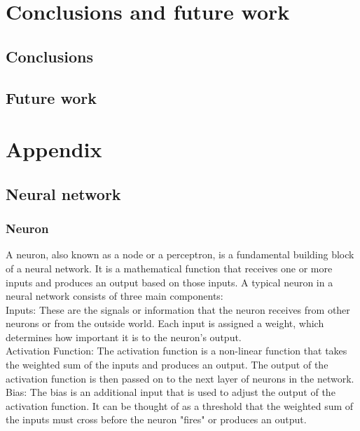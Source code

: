 \documentclass[a4paper]{sapthesis}
\begin{document}
\chapter{Conclusions and future work}
\section{Conclusions}
\section{Future work}
\chapter{Appendix}
\section {Neural network}
\subsection{Neuron}\label{sec:neuron}
A neuron, also known as a node or a perceptron, is a fundamental building
 block of a neural network. It is a mathematical function that receives one
or more inputs and produces an output based on those inputs. \newline 
A typical neuron in a neural network consists of three main components:\newline \\
Inputs: These are the signals or information that the neuron receives from 
other neurons or from the outside world.
 Each input is assigned a weight, which determines how important it is 
 to the neuron's output. \newline \\
Activation Function: The activation function is a non-linear function 
that takes the weighted sum of the inputs and produces an output. 
The output of the activation function is then passed on to the next 
layer of neurons in the network.\newline \\
Bias: The bias is an additional input that is used to adjust the output 
of the activation function. It can be thought of as a threshold that the 
weighted sum of the inputs must cross before the neuron "fires" or 
produces an output.
\end{document}
